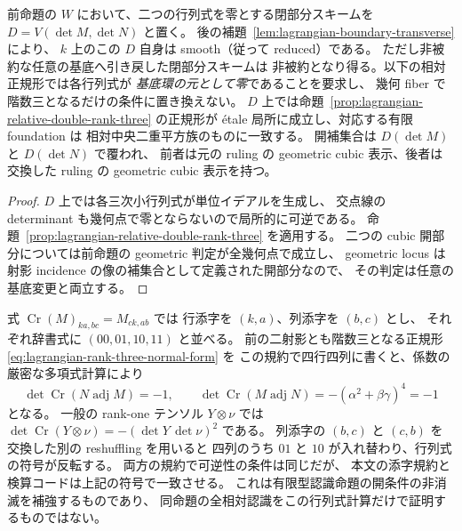 \begin{corollary}
\label{cor:lagrangian-open-closed-recognition}
前命題の $W$ において、二つの行列式を零とする閉部分スキームを
$D=V(\det M,\det N)$ と置く。
後の補題~\ref{lem:lagrangian-boundary-transverse} により、
$k$ 上のこの $D$ 自身は smooth（従って reduced）である。
ただし非被約な任意の基底へ引き戻した閉部分スキームは
非被約となり得る。以下の相対正規形では各行列式が
\emph{基底環の元として零}であることを要求し、
幾何 fiber で階数三となるだけの条件に置き換えない。
$D$ 上では命題~\ref{prop:lagrangian-relative-double-rank-three} の正規形が
\texorpdfstring{\'etale}{etale} 局所に成立し、対応する有限 foundation は
相対中央二重平方族のものに一致する。
開補集合は $D(\det M)$ と $D(\det N)$ で覆われ、
前者は元の ruling の geometric cubic 表示、後者は交換した ruling の
geometric cubic 表示を持つ。
\end{corollary}
\begin{proof}
$D$ 上では各三次小行列式が単位イデアルを生成し、
交点線の determinant も幾何点で零とならないので局所的に可逆である。
命題~\ref{prop:lagrangian-relative-double-rank-three} を適用する。
二つの cubic 開部分については前命題の geometric 判定が全幾何点で成立し、
geometric locus は射影 incidence の像の補集合として定義された開部分なので、
その判定は任意の基底変更と両立する。
\end{proof}

\begin{remark}
\label{rem:lg-cross-reshuffling-sign}
式 $\operatorname{Cr}(M)_{ka,bc}=M_{ck,ab}$ では
行添字を $(k,a)$、列添字を $(b,c)$ とし、
それぞれ辞書式に $(00,01,10,11)$ と並べる。
前の二射影とも階数三となる正規形
\eqref{eq:lagrangian-rank-three-normal-form} を
この規約で四行四列に書くと、係数の厳密な多項式計算により
\[
 \det\operatorname{Cr}(N\operatorname{adj}M)=-1,\qquad
 \det\operatorname{Cr}(M\operatorname{adj}N)
       =-(\alpha^2+\beta\gamma)^4=-1
\]
となる。
一般の rank-one テンソル $Y\otimes\nu$ では
$\det\operatorname{Cr}(Y\otimes\nu)=-(\det Y\,\det\nu)^2$ である。
列添字の $(b,c)$ と $(c,b)$ を交換した別の reshuffling を用いると
四列のうち $01$ と $10$ が入れ替わり、行列式の符号が反転する。
両方の規約で可逆性の条件は同じだが、
本文の添字規約と検算コードは上記の符号で一致させる。
これは有限型認識命題の開条件の非消滅を補強するものであり、
同命題の全相対認識をこの行列式計算だけで証明するものではない。
\end{remark}

